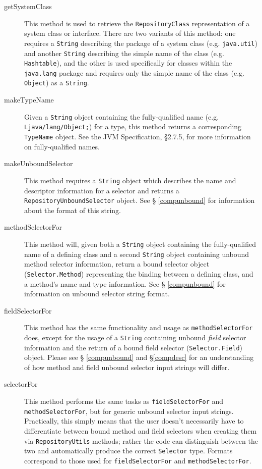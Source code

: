 \documentclass{report}
\begin{document}
\begin{description}

	\item[getSystemClass] This method is used to retrieve the 
	\texttt{Re\-pos\-i\-tory\-Class} representation of a system class or 
	interface. There are two variants of this method: one
	requires a \texttt{String} describing the package of a system class
	(e.g. \texttt{java.util}) and another \texttt{String} describing the 
	simple name of the class (e.g. \texttt{Hashtable}), and the other is
	used specifically for classes within the \texttt{java.lang} package and
	requires only the simple name of the class (e.g. \texttt{Object})
	as a \texttt{String}.

	\item[makeTypeName] Given a \texttt{String} object containing
	the fully-qualified name (e.g. \texttt{Ljava/lang/Object;}) for
	a type, this method returns a corresponding \texttt{TypeName} object.
	See the JVM Specification, \S 2.7.5, for more information
	on fully-qualified names.

	\item[makeUnboundSelector] This method requires a \texttt{String}
	object which describes the name and descriptor information for a
	selector and returns a 
	\texttt{Re\-pos\-i\-tory\-Un\-bound\-Se\-lec\-tor} object. See \S 
	\ref{compunbound} for information about the format of this string.

	\item[methodSelectorFor] This method will, given both a \texttt{String}
	object containing the fully-qualified name of a defining class
	and a second \texttt{String} object containing unbound method selector
	information, return a bound selector object 
	(\texttt{Se\-lec\-tor.Meth\-od}) representing the binding between a 
	defining class, and a method's name and type information. See \S 
	\ref{compunbound} for information on unbound selector string format.

	\item[fieldSelectorFor] This method has the same functionality and
	usage as \texttt{meth\-od\-Se\-lec\-tor\-For} does, except for the 
	usage of a \texttt{String} containing unbound {\em field} selector 
	information and the return of a bound field selector 
	(\texttt{Se\-lec\-tor.Field}) object. Please see \S 
	\ref{compunbound} and \S \ref{compdesc} for an understanding of 
	how method and field unbound selector input strings will differ.

	\item[selectorFor] This method performs the same tasks as
	\texttt{field\-Se\-lec\-tor\-For} and 
	\texttt{meth\-od\-Se\-lec\-tor\-For}, but for generic unbound selector 
	input strings. Practically, this simply means that the user doesn't 
	necessarily have to differentiate between bound method and field 
	selectors when creating them via \texttt{Re\-pos\-i\-tory\-Utils} 
	methods; rather the code can distinguish between the two and 
	automatically produce the correct \texttt{Se\-lec\-tor} type. 
	Formats correspond to those used for \texttt{field\-Se\-lec\-tor\-For} 
	and \texttt{meth\-od\-Se\-lec\-tor\-For}.

\end{description}
\end{document}
